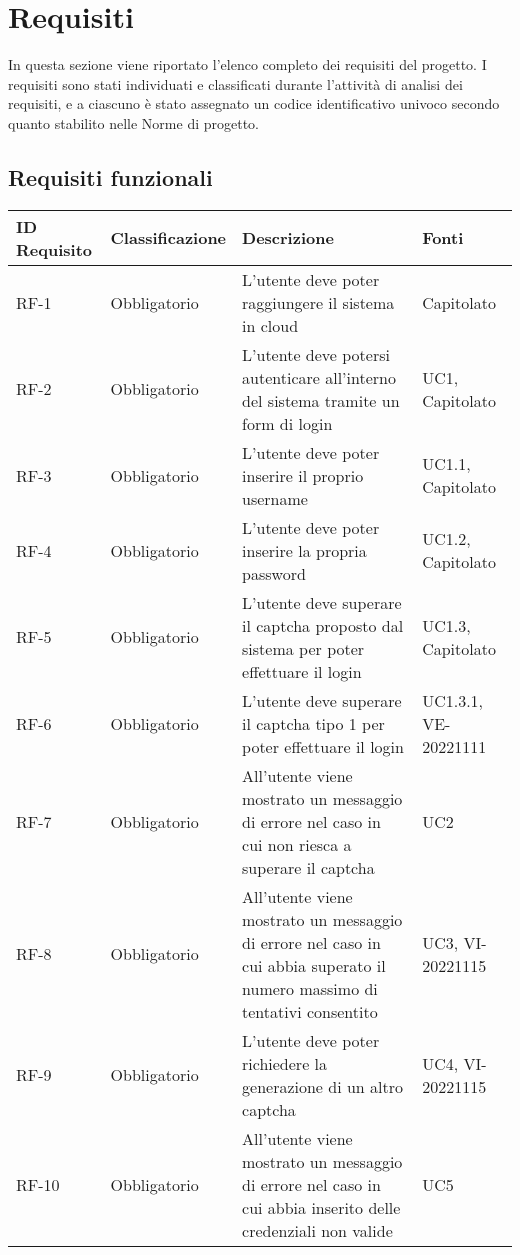 \section{Requisiti}
In questa sezione viene riportato l'elenco completo dei requisiti del progetto.
I requisiti sono stati individuati e classificati durante l'attività di analisi dei requisiti, e a ciascuno è stato assegnato un codice identificativo univoco secondo quanto stabilito nelle Norme di progetto.

\subsection{Requisiti funzionali}
\begin{tabular}{| p{} | p{} | p{} | p{} |} 
 \hline
 \textbf{ID Requisito} & \textbf{Classificazione} & \textbf{Descrizione} & \textbf{Fonti} \\
 \hline
 RF-1 & Obbligatorio &  L'utente deve poter raggiungere il sistema in cloud & Capitolato\\
 \hline
  RF-2 & Obbligatorio &  L'utente deve potersi autenticare all'interno del sistema tramite un form di login &  UC1, Capitolato\\
 \hline
 RF-3 & Obbligatorio &  L'utente deve poter inserire il proprio username &  UC1.1, Capitolato\\
 \hline
 RF-4 & Obbligatorio &  L'utente deve poter inserire la propria password &  UC1.2, Capitolato\\
 \hline
 RF-5 & Obbligatorio &  L'utente deve superare il captcha proposto dal sistema per poter effettuare il login &  UC1.3, Capitolato\\
 \hline
 RF-6 & Obbligatorio &  L'utente deve superare il captcha tipo 1 per poter effettuare il login &  UC1.3.1, VE-20221111\\
 \hline
 RF-7 & Obbligatorio & All'utente viene mostrato un messaggio di errore nel caso in cui non riesca a superare il captcha &  UC2\\
 \hline
 RF-8 & Obbligatorio &  All'utente viene mostrato un messaggio di errore nel caso in cui abbia superato il numero massimo di tentativi consentito &  UC3, VI-20221115\\
 \hline
 RF-9 & Obbligatorio &  L'utente deve poter richiedere la generazione di un altro captcha &  UC4, VI-20221115\\
 \hline
 RF-10 & Obbligatorio & All'utente viene mostrato un messaggio di errore nel caso in cui abbia inserito delle credenziali non valide &  UC5\\
 \hline
\end{tabular}

